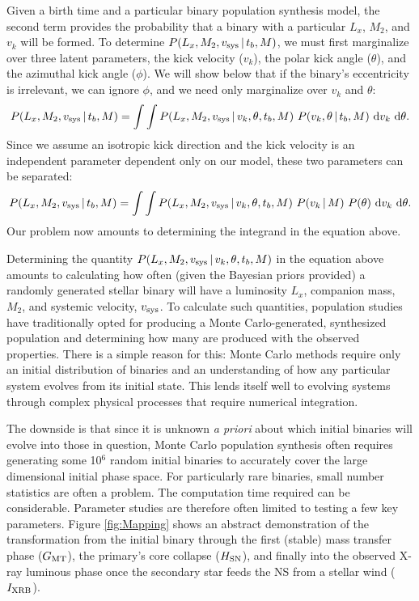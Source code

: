 \documentclass[12pt, preprint]{aastex}
\newcommand{\given}{\,|\,}
\newcommand{\dd}{\mathrm{d}}
\begin{document}
Given a birth time and a particular binary population synthesis model, the second term provides the probability that a binary with a particular $L_x$, $M_2$, and $v_k$ will be formed. To determine $P(L_x, M_2, v_{\rm sys} \given t_b, M)$, we must first marginalize over three latent parameters, the kick velocity ($v_k$), the polar kick angle ($\theta$), and the azimuthal kick angle ($\phi$). We will show below that if the binary's eccentricity is irrelevant, we can ignore $\phi$, and we need only marginalize over $v_k$ and $\theta$:
\begin{equation}
P(L_x, M_2, v_{\rm sys} \given t_b, M) = \int \int P(L_x, M_2, v_{\rm sys} \given v_k, \theta, t_b, M)\ P(v_k, \theta \given t_b, M)\ \dd v_k\ \dd \theta.
\end{equation}
Since we assume an isotropic kick direction and the kick velocity is an independent parameter dependent only on our model, these two parameters can be separated:
\begin{equation}
P(L_x, M_2, v_{\rm sys} \given t_b, M) = \int \int P(L_x, M_2, v_{\rm sys} \given v_k, \theta, t_b, M)\ P(v_k \given M)\ P(\theta)\ \dd v_k\ \dd \theta. \label{eq:P_marginalized}
\end{equation}
Our problem now amounts to determining the integrand in the equation above.


Determining the quantity $P(L_x, M_2, v_{\rm sys} \given v_k, \theta, t_b, M)$ in the equation above amounts to calculating how often (given the Bayesian priors provided) a randomly generated stellar binary will have a luminosity $L_x$, companion mass, $M_2$, and systemic velocity, $v_{\rm sys}$. To calculate such quantities, population studies have traditionally opted for producing a Monte Carlo-generated, synthesized population and determining how many are produced with the observed properties. There is a simple reason for this: Monte Carlo methods require only an initial distribution of binaries and an understanding of how any particular system evolves from its initial state. This lends itself well to evolving systems through complex physical processes that require numerical integration. 


The downside is that since it is unknown {\it a priori} about which initial binaries will evolve into those in question, Monte Carlo population synthesis often requires generating some 10$^6$ random initial binaries to accurately cover the large dimensional initial phase space. For particularly rare binaries, small number statistics are often a problem. The computation time required can be considerable. Parameter studies are therefore often limited to testing a few key parameters. Figure \ref{fig:Mapping} shows an abstract demonstration of the transformation from the initial binary through the first (stable) mass transfer phase ($G_{\rm MT}$), the primary's core collapse ($H_{\rm SN}$), and finally into the observed X-ray luminous phase once the secondary star feeds the NS from a stellar wind ($I_{\rm XRB}$).
\end{document}
